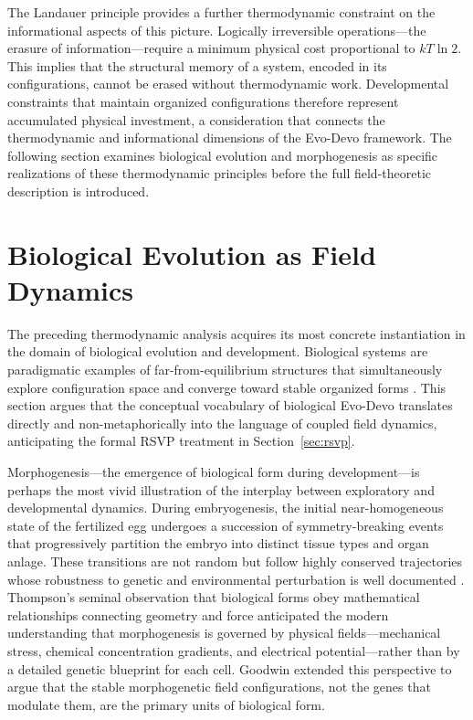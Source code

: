 \documentclass[12pt]{article}
\begin{document}
The Landauer principle \cite{landauer1961} provides a further thermodynamic constraint on the informational aspects of this picture. Logically irreversible operations---the erasure of information---require a minimum physical cost proportional to $kT\ln 2$. This implies that the structural memory of a system, encoded in its configurations, cannot be erased without thermodynamic work. Developmental constraints that maintain organized configurations therefore represent accumulated physical investment, a consideration that connects the thermodynamic and informational dimensions of the Evo-Devo framework. The following section examines biological evolution and morphogenesis as specific realizations of these thermodynamic principles before the full field-theoretic description is introduced.

\section{Biological Evolution as Field Dynamics}
\label{sec:bio}

The preceding thermodynamic analysis acquires its most concrete instantiation in the domain of biological evolution and development. Biological systems are paradigmatic examples of far-from-equilibrium structures that simultaneously explore configuration space and converge toward stable organized forms \cite{kauffman1993,smithmorowitz2016}. This section argues that the conceptual vocabulary of biological Evo-Devo translates directly and non-metaphorically into the language of coupled field dynamics, anticipating the formal RSVP treatment in Section~\ref{sec:rsvp}.

Morphogenesis---the emergence of biological form during development---is perhaps the most vivid illustration of the interplay between exploratory and developmental dynamics. During embryogenesis, the initial near-homogeneous state of the fertilized egg undergoes a succession of symmetry-breaking events that progressively partition the embryo into distinct tissue types and organ anlage. These transitions are not random but follow highly conserved trajectories whose robustness to genetic and environmental perturbation is well documented \cite{goodwin1994,thompson1917}. Thompson's seminal observation \cite{thompson1917} that biological forms obey mathematical relationships connecting geometry and force anticipated the modern understanding that morphogenesis is governed by physical fields---mechanical stress, chemical concentration gradients, and electrical potential---rather than by a detailed genetic blueprint for each cell. Goodwin \cite{goodwin1994} extended this perspective to argue that the stable morphogenetic field configurations, not the genes that modulate them, are the primary units of biological form.
\end{document}
